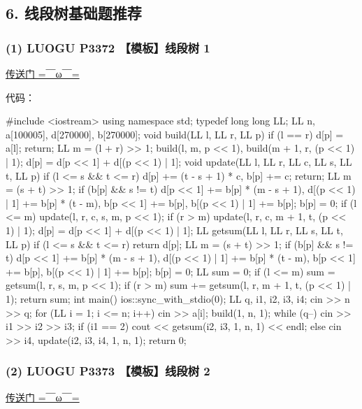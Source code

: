 \subsection{6. 线段树基础题推荐}

\subsubsection{(1) LUOGU P3372 【模板】线段树 1}

\href{https://www.luogu.org/problem/show?pid=3372}{传送门 =￣ω￣=}

代码：

\begin{cppcode}
#include <iostream>
using namespace std;
typedef long long LL;
LL n, a[100005], d[270000], b[270000];
void build(LL l, LL r, LL p) {
  if (l == r) {
    d[p] = a[l];
    return;
  }
  LL m = (l + r) >> 1;
  build(l, m, p << 1), build(m + 1, r, (p << 1) | 1);
  d[p] = d[p << 1] + d[(p << 1) | 1];
}
void update(LL l, LL r, LL c, LL s, LL t, LL p) {
  if (l <= s && t <= r) {
    d[p] += (t - s + 1) * c, b[p] += c;
    return;
  }
  LL m = (s + t) >> 1;
  if (b[p] && s != t)
    d[p << 1] += b[p] * (m - s + 1), d[(p << 1) | 1] += b[p] * (t - m),
        b[p << 1] += b[p], b[(p << 1) | 1] += b[p];
  b[p] = 0;
  if (l <= m) update(l, r, c, s, m, p << 1);
  if (r > m) update(l, r, c, m + 1, t, (p << 1) | 1);
  d[p] = d[p << 1] + d[(p << 1) | 1];
}
LL getsum(LL l, LL r, LL s, LL t, LL p) {
  if (l <= s && t <= r) return d[p];
  LL m = (s + t) >> 1;
  if (b[p] && s != t)
    d[p << 1] += b[p] * (m - s + 1), d[(p << 1) | 1] += b[p] * (t - m),
        b[p << 1] += b[p], b[(p << 1) | 1] += b[p];
  b[p] = 0;
  LL sum = 0;
  if (l <= m) sum = getsum(l, r, s, m, p << 1);
  if (r > m) sum += getsum(l, r, m + 1, t, (p << 1) | 1);
  return sum;
}
int main() {
  ios::sync_with_stdio(0);
  LL q, i1, i2, i3, i4;
  cin >> n >> q;
  for (LL i = 1; i <= n; i++) cin >> a[i];
  build(1, n, 1);
  while (q--) {
    cin >> i1 >> i2 >> i3;
    if (i1 == 2)
      cout << getsum(i2, i3, 1, n, 1) << endl;
    else
      cin >> i4, update(i2, i3, i4, 1, n, 1);
  }
  return 0;
}
\end{cppcode}

\subsubsection{(2) LUOGU P3373 【模板】线段树 2}

\href{https://www.luogu.org/problem/show?pid=3372}{传送门 =￣ω￣=}

